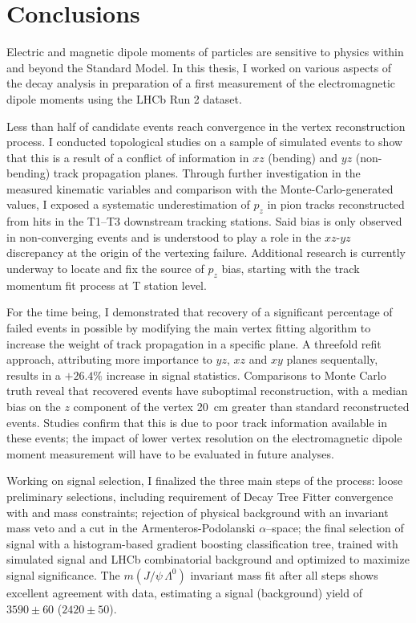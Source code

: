 \chapter*{Conclusions}

Electric and magnetic dipole moments of particles are sensitive to physics within and beyond the Standard Model.
In this thesis, I worked on various aspects of the \demonstratorshort decay analysis in preparation of a first measurement of the \lz electromagnetic dipole moments using the LHCb Run 2 dataset.

Less than half of candidate \lambdadecay events reach convergence in the vertex reconstruction process.
I conducted topological studies on a sample of simulated events to show that this is a result of a conflict of information in $xz$ (bending) and $yz$ (non-bending) track propagation planes.
Through further investigation in the measured kinematic variables and comparison with the Monte-Carlo-generated values, I exposed a systematic underestimation of $p_z$ in pion tracks reconstructed from hits in the T1--T3 downstream tracking stations.
Said bias is only observed in non-converging \lambdadecay events and is understood to play a role in the $xz$-$yz$ discrepancy at the origin of the vertexing failure.
Additional research is currently underway to locate and fix the source of $p_z$ bias, starting with the track momentum fit process at T station level.

For the time being, I demonstrated that recovery of a significant percentage of failed events in possible by modifying the main vertex fitting algorithm to increase the weight of track propagation in a specific plane.
A threefold refit approach, attributing more importance to $yz$, $xz$ and $xy$ planes sequentally, results in a $+26.4\%$ increase in signal statistics.
Comparisons to Monte Carlo truth reveal that recovered events have suboptimal reconstruction, with a median bias on the $z$ component of the \lambdadecay vertex \SI{20}{\centi\meter} greater than standard reconstructed events.
Studies confirm that this is due to poor track information available in these events;
the impact of lower vertex resolution on the \lz electromagnetic dipole moment measurement will have to be evaluated in future analyses.

Working on \demonstratorshort signal selection, I finalized the three main steps of the process:
loose preliminary selections, including requirement of Decay Tree Fitter convergence with \jpsi and \lz mass constraints;
rejection of \physbkgshort physical background with an invariant mass veto and a cut in the Armenteros-Podolanski $\alpha$--\pt space;
the final selection of signal with a histogram-based gradient boosting classification tree, trained with simulated signal and LHCb combinatorial background and optimized to maximize \demonstratorshort signal significance.
The $m(J/\psi\,\Lambda^0)$ invariant mass fit after all steps shows excellent agreement with data, estimating a signal (background) yield of $3590 \pm 60$ ($2420 \pm 50$).

